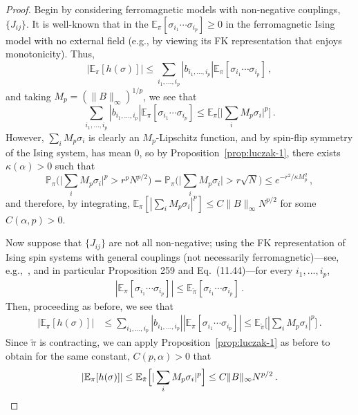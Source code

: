 \documentclass[reqno,11pt]{amsart}
\numberwithin{equation}{section}
\theoremstyle{definition}{
\newtheorem{example}[theorem]{Example}
\newtheorem{definition}[theorem]{Definition}
\newtheorem*{definition*}{Definition}
\newtheorem{problem}[theorem]{Problem}
\newtheorem{question}[theorem]{Question}
\newtheorem{remark}[theorem]{Remark}
}
\renewcommand{\P}{\mathbb P}
\begin{document}
\begin{proof}
Begin by considering ferromagnetic models with non-negative couplings, $\{J_{ij}\}$. It is well-known that in the $\mathbb E_{\pi} [\sigma_{i_1}\cdots \sigma_{i_p}] \geq 0$
in the ferromagnetic Ising model with no external field (e.g., by viewing its FK representation that enjoys monotonicity).
Thus,
\[
|\mathbb E_{\pi}[h(\sigma)]| \leq \sum_{i_1,...,i_p} |b_{i_1,...,i_p}| \mathbb E_{\pi}[\sigma_{i_1}\cdots \sigma_{i_p}]\,,
\]
and taking $M_p= (\|B\|_\infty)^{1/p}$, we see that 
\[\sum _{i_1,...,i_p} |b_{i_1,...,i_p}| \mathbb E_{\pi} [\sigma_{i_1} \cdots \sigma_{i_p}] \leq \mathbb E_{\pi} \bigg[\Big|\sum_i M_p \sigma_i\Big|^p\bigg]\,.
\] 
However, $\sum_{i} M_p\sigma_i$ is clearly an $M_p$-Lipschitz function, and by spin-flip symmetry of the Ising system, has mean $0$, so by Proposition~\ref{prop:luczak-1}, there exists $\kappa(\alpha)>0$ such that
\[\P_{\pi} \bigg(\Big|\sum_i M_p \sigma_i\Big|^p >r^p N^{p/2}\bigg)= \P_{\pi} \bigg(\Big|\sum_i M_p\sigma_i \Big| >r\sqrt N\bigg) \leq e^{-r^2/\kappa M_p^2}\,,
\]
and therefore, by integrating, $\mathbb E_{\pi} [|\sum_{i} M_p\sigma_i|^p] \leq C\|B\|_\infty N^{p/2}$ for some $C(\alpha,p)>0$.

Now suppose that $\{J_{ij}\}$ are not all non-negative; using the FK representation of Ising spin systems with general couplings (not necessarily ferromagnetic)---see, e.g.,~\cite[\S11.5]{Gr04}, and in particular Proposition 259 and Eq.~(11.44)---for every $i_1,...,i_p$, 
\begin{align}\label{eq:fk-ferro-comparison}
\left|\mathbb E_{\pi} [\sigma_{i_1} \cdots \sigma_{i_p}]\right| \leq \mathbb E_{\tilde \pi} [\sigma_{i_1} \cdots \sigma_{i_p}]\,.
\end{align}
Then, proceeding as before, we see that 
\begin{align*}
|\mathbb E_{\pi} [ h(\sigma)] | & \leq \sum_{i_1,...,i_p} |b_{i_1,...,i_p}| |\mathbb E_{\pi} [\sigma_{i_1} \cdots \sigma_{i_p}]| 
 \leq \mathbb E_{\tilde \pi } \Big[|\sum_i M_p\sigma_i | ^p\Big]\,.
\end{align*}
Since $\tilde \pi$ is contracting, we can apply Proposition~\ref{prop:luczak-1} as before to obtain for the same constant, $C(p,\alpha)>0$ that 
\[|\mathbb E_{\pi} [h(\sigma)] | \leq \mathbb E_{\tilde \pi} \Big[|\sum_i M_p\sigma_i|^p\Big] \leq C\|B\|_\infty N^{p/2}\,. \qedhere
\]
\end{proof}
\end{document}
